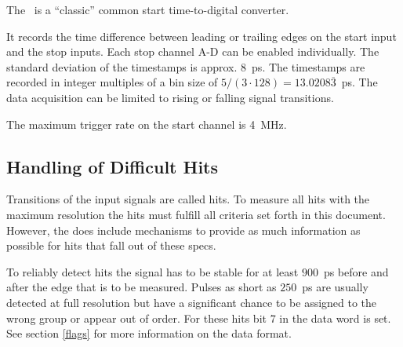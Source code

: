  { %
The \deviceName\ is a ``classic'' common start time-to-digital converter. 

It records the time difference between leading or trailing edges on the start input and the stop inputs. 
Each stop channel A-D can be enabled individually. 
The standard deviation of the timestamps is approx. $8$~ps. 
The timestamps are recorded in integer multiples of a bin size of $5/(3\cdot 128) = 13.0208\overline{3}$~ps. 
The data acquisition can be limited to rising or falling signal transitions. 

The maximum trigger rate on the start channel is 4~MHz.

\subsection{Handling of Difficult Hits}
    \label{difficulthits}
    Transitions of the input signals are called hits. To measure all hits with the maximum resolution the hits must fulfill all criteria set forth in this document.
    However, the \deviceName does include mechanisms to provide as much information as possible for hits that fall out of these specs.

    To reliably detect hits the signal has to be stable for at least $900$~ps before and after the edge that is to be measured. 
    Pulses as short as $250$~ps are usually detected at full resolution but have a significant chance to be assigned to the wrong group or appear out of order. 
    For these hits bit 7 in the data word is set. See section \ref{flags} for more information on the data format.

}
